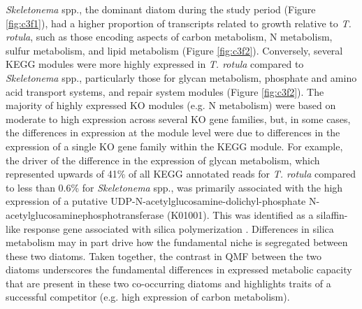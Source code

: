 \textit{Skeletonema} spp., the dominant diatom during the study period (Figure \ref{fig:c3f1}), had a higher proportion of transcripts related to growth relative to \textit{T. rotula}, such as those encoding aspects of carbon metabolism, N metabolism, sulfur metabolism, and lipid metabolism (Figure \ref{fig:c3f2}). Conversely, several KEGG modules were more highly expressed in \textit{T. rotula} compared to \textit{Skeletonema} spp., particularly those for glycan metabolism, phosphate and amino acid transport systems, and repair system modules (Figure \ref{fig:c3f2}). The majority of highly expressed KO modules (e.g. N metabolism) were based on moderate to high expression across several KO gene families, but, in some cases, the differences in expression at the module level were due to differences in the expression of a single KO gene family within the KEGG module. For example, the driver of the difference in the expression of glycan metabolism, which represented upwards of 41\% of all KEGG annotated reads for \textit{T. rotula} compared to less than 0.6\% for \textit{Skeletonema} spp., was primarily associated with the high expression of a putative UDP-N-acetylglucosamine-dolichyl-phosphate N-acetylglucosaminephosphotransferase (K01001). This was identified as a silaffin-like response gene associated with silica polymerization \citep{Shrestha2012}. Differences in silica metabolism may in part drive how the fundamental niche is segregated between these two diatoms. Taken together, the contrast in QMF between the two diatoms underscores the fundamental differences in expressed metabolic capacity that are present in these two co-occurring diatoms and highlights traits of a successful competitor (e.g. high expression of carbon metabolism).\par

